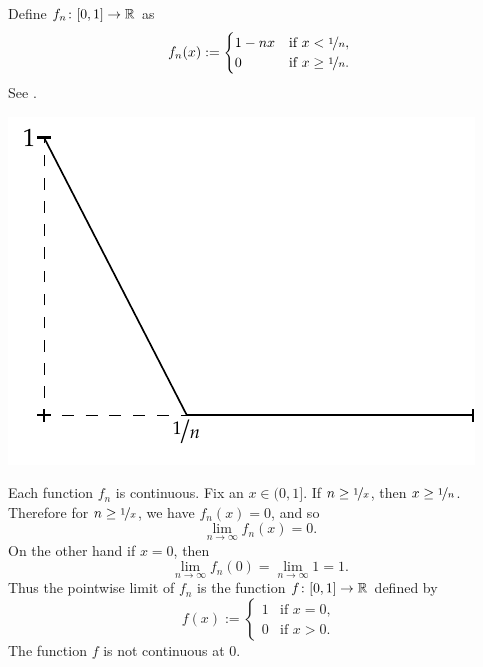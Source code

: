 \begin{example}
Define $f_n \colon [0,1] \to {\mathbb{R}}$ as
\begin{equation*}
f_n(x) :=
\begin{cases}
1-nx &  \text{if } x < \nicefrac{1}{n},\\
0 &  \text{if } x \geq \nicefrac{1}{n}.
\end{cases}
\end{equation*}
See .

\begin{myfigureht}
\includegraphics{figures/contconvcntr}
\caption{Graph of $f_n(x)$.%
\label{contconvcntr:fig}}
\end{myfigureht}

Each function $f_n$ is continuous.
Fix an $x \in (0,1]$.  If $n \geq \nicefrac{1}{x}$,
then $x \geq \nicefrac{1}{n}$.  Therefore for $n \geq \nicefrac{1}{x}$,
we have $f_n(x) = 0$, and so
\begin{equation*}
\lim_{n \to \infty} f_n(x) = 0.
\end{equation*}
On the other hand if $x=0$, then
\begin{equation*}
\lim_{n \to \infty} f_n(0) = 
\lim_{n \to \infty} 1 = 1.
\end{equation*}
Thus the pointwise limit of $f_n$ is the function
$f \colon [0,1] \to {\mathbb{R}}$ defined by
\begin{equation*}
f(x) :=
\begin{cases}
1 &  \text{if } x = 0,\\
0 &  \text{if } x > 0.
\end{cases}
\end{equation*}
The function $f$ is not continuous at 0.
\end{example}

